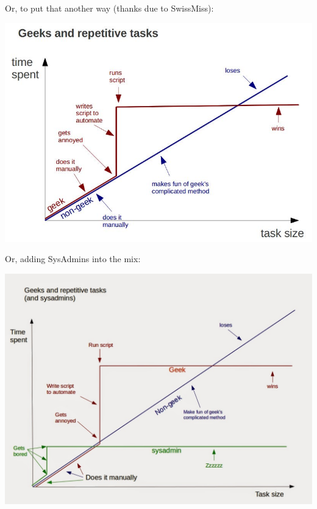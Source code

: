 \documentclass[aspectratio=169]{beamer}
\begin{document}
\begin{frame}
Or, to put that another way
(thanks due to SwissMiss):

\centering
\vspace{10pt}
\includegraphics[height=0.8\textheight]{Geeks.jpg}

\end{frame}


\begin{frame}
Or, adding SysAdmins into the mix:

\centering
\vspace{10pt}
\includegraphics[height=0.8\textheight]{Geeks2.jpg}

\end{frame}
\end{document}
